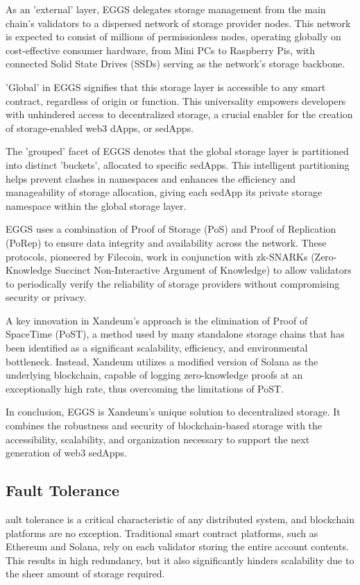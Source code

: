 \documentclass[11pt]{article}   	%
\begin{document}
As an 'external' layer, EGGS delegates storage management from the main chain's validators to a dispersed network of storage provider nodes. This network is expected to consist of millions of permissionless nodes, operating globally on cost-effective consumer hardware, from Mini PCs to Raspberry Pis, with connected Solid State Drives (SSDs) serving as the network's storage backbone.

'Global' in EGGS signifies that this storage layer is accessible to any smart contract, regardless of origin or function. This universality empowers developers with unhindered access to decentralized storage, a crucial enabler for the creation of storage-enabled web3 dApps, or sedApps.

The 'grouped' facet of EGGS denotes that the global storage layer is partitioned into distinct 'buckets', allocated to specific sedApps. This intelligent partitioning helps prevent clashes in namespaces and enhances the efficiency and manageability of storage allocation, giving each sedApp its private storage namespace within the global storage layer.

EGGS uses a combination of Proof of Storage (PoS) and Proof of Replication (PoRep) to ensure data integrity and availability across the network. These protocols, pioneered by Filecoin, work in conjunction with zk-SNARKs (Zero-Knowledge Succinct Non-Interactive Argument of Knowledge) to allow validators to periodically verify the reliability of storage providers without compromising security or privacy.

A key innovation in Xandeum's approach is the elimination of Proof of SpaceTime (PoST), a method used by many standalone storage chains that has been identified as a significant scalability, efficiency, and environmental bottleneck. Instead, Xandeum utilizes a modified version of Solana as the underlying blockchain, capable of logging zero-knowledge proofs at an exceptionally high rate, thus overcoming the limitations of PoST.

In conclusion, EGGS is Xandeum's unique solution to decentralized storage. It combines the robustness and security of blockchain-based storage with the accessibility, scalability, and organization necessary to support the next generation of web3 sedApps.

\subsection{Fault Tolerance}
ault tolerance is a critical characteristic of any distributed system, and blockchain platforms are no exception. Traditional smart contract platforms, such as Ethereum and Solana, rely on each validator storing the entire account contents. This results in high redundancy, but it also significantly hinders scalability due to the sheer amount of storage required.
\end{document}
